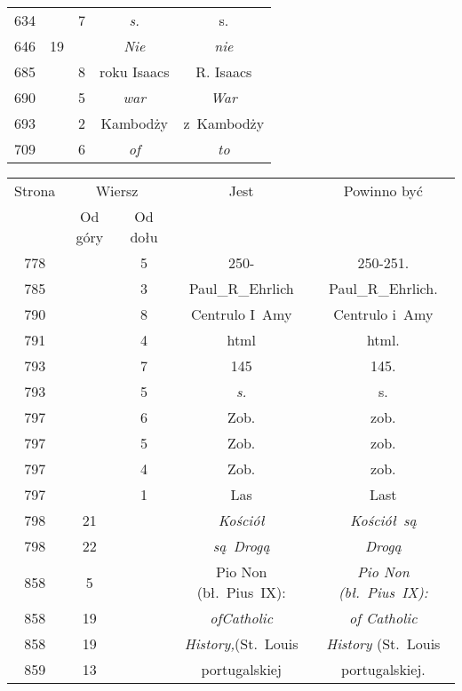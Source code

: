 \documentclass[a4paper,11pt]{article}
\numberwithin{equation}{section}
\begin{document}
\begin{center}
\begin{tabular}{|c|c|c|c|c|}
    634 & & \hphantom{0}7 & \textit{s.} & s. \\
    646 & 19 & & \textit{Nie} & \textit{nie} \\
    685 & & \hphantom{0}8 & roku Isaacs & R. Isaacs \\
    690 & & \hphantom{0}5 & \textit{war} & \textit{War} \\
    693 & & \hphantom{0}2 & Kambodży & z~Kambodży \\
    709 & & \hphantom{0}6 & \textit{of} & \textit{to} \\
    \hline
  \end{tabular}





  \newpage

  \begin{tabular}{|c|c|c|c|c|}
    \hline
    Strona & \multicolumn{2}{c|}{Wiersz} & Jest
                              & Powinno być \\ \cline{2-3}
    & Od góry & Od dołu & & \\
    \hline
    778 & & \hphantom{0}5 & 250- & 250-251. \\
    785 & & \hphantom{0}3 & Paul\_R\_Ehrlich & Paul\_R\_Ehrlich. \\
    790 & & \hphantom{0}8 & Centrulo I~Amy & Centrulo i~Amy \\
    791 & & \hphantom{0}4 & html & html. \\
    793 & & \hphantom{0}7 & 145 & 145. \\
    793 & & \hphantom{0}5 & \textit{s.} & s. \\
    797 & & \hphantom{0}6 & Zob. & zob. \\
    797 & & \hphantom{0}5 & Zob. & zob. \\
    797 & & \hphantom{0}4 & Zob. & zob. \\
    797 & & \hphantom{0}1 & Las & Last \\
    798 & 21 & & \textit{Kościół} & \textit{Kościół~są} \\
    798 & 22 & & \textit{są~Drogą} & \textit{Drogą} \\
    858 & \hphantom{0}5 & & Pio Non (bł.~Pius~IX):
           & \textit{Pio Non (bł.~Pius~IX):} \\
    858 & 19 & & \textit{ofCatholic} & \textit{of Catholic} \\
    858 & 19 & & \textit{History,}(St.~Louis
           & \textit{History} (St.~Louis \\
    859 & 13 & & portugalskiej & portugalskiej. \\

\end{tabular}
\end{center}
\end{document}

